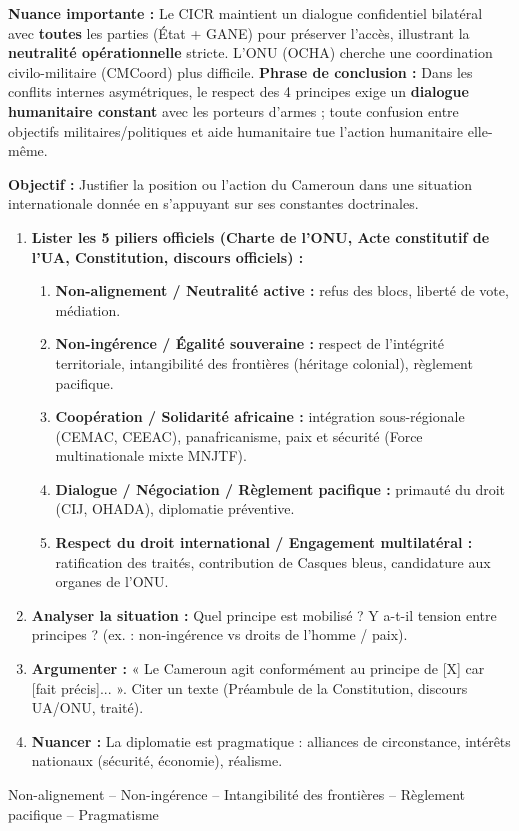 \documentclass[11pt]{article}
\newcommand{\cle}[1]{{\popxbold\color{popdark}#1}}
\begin{document}
\begin{exoresolu}
\textbf{Nuance importante :} Le CICR maintient un dialogue confidentiel bilatéral avec \textbf{toutes} les parties (État + GANE) pour préserver l'accès, illustrant la \textbf{neutralité opérationnelle} stricte. L'ONU (OCHA) cherche une coordination civilo-militaire (CMCoord) plus difficile.
\textbf{Phrase de conclusion :} Dans les conflits internes asymétriques, le respect des 4 principes exige un \textbf{dialogue humanitaire constant} avec les porteurs d'armes ; toute confusion entre objectifs militaires/politiques et aide humanitaire tue l'action humanitaire elle-même.
\end{exoresolu}

\begin{methode}
\textbf{Objectif :} Justifier la position ou l'action du Cameroun dans une situation internationale donnée en s'appuyant sur ses constantes doctrinales.
\begin{enumerate}
    \item \textbf{Lister les 5 piliers officiels (Charte de l'ONU, Acte constitutif de l'UA, Constitution, discours officiels) :}
    \begin{enumerate}
        \item \textbf{Non-alignement / Neutralité active :} refus des blocs, liberté de vote, médiation.
        \item \textbf{Non-ingérence / Égalité souveraine :} respect de l'intégrité territoriale, intangibilité des frontières (héritage colonial), règlement pacifique.
        \item \textbf{Coopération / Solidarité africaine :} intégration sous-régionale (CEMAC, CEEAC), panafricanisme, paix et sécurité (Force multinationale mixte MNJTF).
        \item \textbf{Dialogue / Négociation / Règlement pacifique :} primauté du droit (CIJ, OHADA), diplomatie préventive.
        \item \textbf{Respect du droit international / Engagement multilatéral :} ratification des traités, contribution de Casques bleus, candidature aux organes de l'ONU.
    \end{enumerate}
    \item \textbf{Analyser la situation :} Quel principe est mobilisé ? Y a-t-il tension entre principes ? (ex. : non-ingérence vs droits de l'homme / paix).
    \item \textbf{Argumenter :} « Le Cameroun agit conformément au principe de [X] car [fait précis]... ». Citer un texte (Préambule de la Constitution, discours UA/ONU, traité).
    \item \textbf{Nuancer :} La diplomatie est pragmatique : alliances de circonstance, intérêts nationaux (sécurité, économie), réalisme.
\end{enumerate}
\cle{Non-alignement} -- \cle{Non-ingérence} -- \cle{Intangibilité des frontières} -- \cle{Règlement pacifique} -- \cle{Pragmatisme}
\end{methode}
\end{document}
